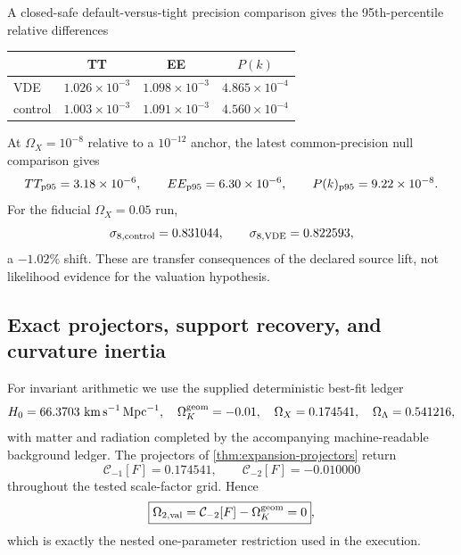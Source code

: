 \documentclass[aps,prd,reprint,onecolumn,nofootinbib,superscriptaddress,showkeys]{revtex4-2}
\numberwithin{equation}{section}
\theoremstyle{definition}
\theoremstyle{plain}
\begin{document}
A closed-safe default-versus-tight precision comparison gives the 95th-percentile relative differences
\begin{center}
\begin{tabular}{@{}lccc@{}}
\toprule
 & TT & EE & \(P(k)\) \\
\midrule
VDE & \(1.026\times10^{-3}\) & \(1.098\times10^{-3}\) & \(4.865\times10^{-4}\) \\
control & \(1.003\times10^{-3}\) & \(1.091\times10^{-3}\) & \(4.560\times10^{-4}\) \\
\bottomrule
\end{tabular}
\end{center}
At \(\Omega_X=10^{-8}\) relative to a \(10^{-12}\) anchor, the latest common-precision null comparison gives
\begin{equation}
TT_{\rm p95}=3.18\times10^{-6},\qquad
EE_{\rm p95}=6.30\times10^{-6},\qquad
P(k)_{\rm p95}=9.22\times10^{-8}.
\end{equation}
For the fiducial \(\Omega_X=0.05\) run,
\begin{equation}
\sigma_{8,{\rm control}}=0.831044,
\qquad
\sigma_{8,{\rm VDE}}=0.822593,
\end{equation}
a \(-1.02\%\) shift.  These are transfer consequences of the declared source lift, not likelihood evidence for the valuation hypothesis.

\subsection{Exact projectors, support recovery, and curvature inertia}

For invariant arithmetic we use the supplied deterministic best-fit ledger
\begin{equation}
H_0=66.3703\ {\rm km\,s^{-1}\,Mpc^{-1}},\quad
\Omega_K^{\rm geom}=-0.01,\quad
\Omega_X=0.174541,\quad
\Omega_\Lambda=0.541216,
\end{equation}
with matter and radiation completed by the accompanying machine-readable background ledger.  The projectors of \cref{thm:expansion-projectors} return
\begin{equation}
\boxed{\mathcal C_{-1}[F]=0.174541},
\qquad
\boxed{\mathcal C_{-2}[F]=-0.010000}
\end{equation}
throughout the tested scale-factor grid.  Hence
\begin{equation}
\boxed{\Omega_{2,{\rm val}}=\mathcal C_{-2}[F]-\Omega_K^{\rm geom}=0},
\end{equation}
which is exactly the nested one-parameter restriction used in the execution.
\end{document}
